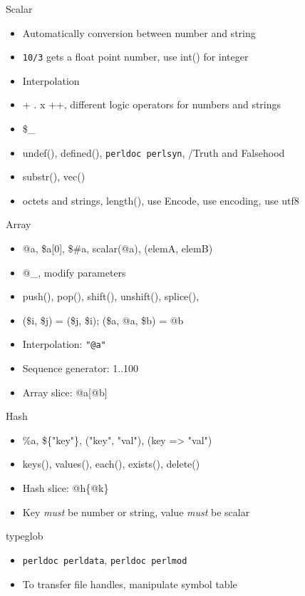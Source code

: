 \documentclass{beamer}
\begin{document}
\begin{frame}{Scalar}
  \begin{itemize}
    \item Automatically conversion between number and string
    \item \texttt{10/3} gets a float point number, use int() for integer
    \item Interpolation
    \item + . x ++, different logic operators for numbers and strings
    \item \$\_
    \item undef(), defined(), \texttt{perldoc perlsyn}, /Truth and Falsehood
    \item substr(), vec()
    \item octets and strings, length(), use Encode, use encoding, use utf8
  \end{itemize}
\end{frame}


\begin{frame}{Array}
  \begin{itemize}
    \item @a, \$a[0], \$\#a, scalar(@a), (elemA, elemB)
    \item @\_, modify parameters
    \item push(), pop(), shift(), unshift(), splice(),
    \item (\$i, \$j) = (\$j, \$i); (\$a, @a, \$b) = @b
    \item Interpolation: \texttt{"@a"}
    \item Sequence generator: 1..100
    \item Array slice: @a[@b]
  \end{itemize}
\end{frame}

\begin{frame}{Hash}
  \begin{itemize}
    \item \%a, \$\{"key"\}, ("key", "val"), (key => "val")
    \item keys(), values(), each(), exists(), delete()
    \item Hash slice: @h\{@k\}
    \item Key \emph{must} be number or string, value \emph{must} be scalar
  \end{itemize}
\end{frame}

\begin{frame}{typeglob}
  \begin{itemize}
    \item \texttt{perldoc perldata}, \texttt{perldoc perlmod}
    \item To transfer file handles, manipulate symbol table
  \end{itemize}
\end{frame}
\end{document}
